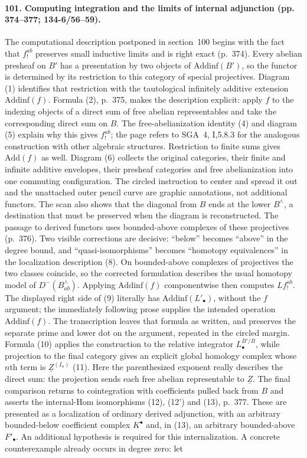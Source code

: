 \paragraph{101. Computing integration and the limits of internal adjunction (pp. 374--377; 134-6/56--59).}
The computational description postponed in section~100 begins with the fact that $f_!^{ab}$ preserves small inductive limits and is right exact (p.~374). Every abelian presheaf on $B'$ has a presentation by two objects of $\mathrm{Addinf}(B')$, so the functor is determined by its restriction to this category of special projectives. Diagram (1) identifies that restriction with the tautological infinitely additive extension $\mathrm{Addinf}(f)$. Formula (2), p.~375, makes the description explicit: apply $f$ to the indexing objects of a direct sum of free abelian representables and take the corresponding direct sum on $B$. The free-abelianization identity (4) and diagram (5) explain why this gives $f_!^{ab}$; the page refers to SGA~4, I,5.8.3 for the analogous construction with other algebraic structures. Restriction to finite sums gives $\mathrm{Add}(f)$ as well. Diagram (6) collects the original categories, their finite and infinite additive envelopes, their presheaf categories and free abelianization into one commuting configuration. The circled instruction to center and spread it out and the unattached outer pencil curve are graphic annotations, not additional functors. The scan also shows that the diagonal from $B$ ends at the lower $B^{\wedge}$, a destination that must be preserved when the diagram is reconstructed. The passage to derived functors uses bounded-above complexes of these projectives (p.~376). Two visible corrections are decisive: ``below'' becomes ``above'' in the degree bound, and ``quasi-isomorphisms'' becomes ``homotopy equivalences'' in the localization description (8). On bounded-above complexes of projectives the two classes coincide, so the corrected formulation describes the usual homotopy model of $D^-(B^{\wedge}_{ab})$. Applying $\mathrm{Addinf}(f)$ componentwise then computes $Lf_!^{ab}$. The displayed right side of (9) literally has $\mathrm{Addinf}(L'_{\bullet})$, without the $f$ argument; the immediately following prose supplies the intended operation $\mathrm{Addinf}(f)$. The transcription leaves that formula as written, and preserves the separate prime and lower dot on the argument, repeated in the circled margin. Formula (10) applies the construction to the relative integrator $L^{B'/B}_{\bullet}$, while projection to the final category gives an explicit global homology complex whose $n$th term is $\underline Z^{(I_n)}$ (11). Here the parenthesized exponent really describes the direct sum: the projection sends each free abelian representable to $\underline Z$. The final comparison returns to cointegration with coefficients pulled back from $B$ and asserts the internal-Hom isomorphisms (12), (12') and (13), p.~377. These are presented as a localization of ordinary derived adjunction, with an arbitrary bounded-below coefficient complex $K^{\bullet}$ and, in (13), an arbitrary bounded-above $F'_{\bullet}$. An additional hypothesis is required for this internalization. A concrete counterexample already occurs in degree zero: let 